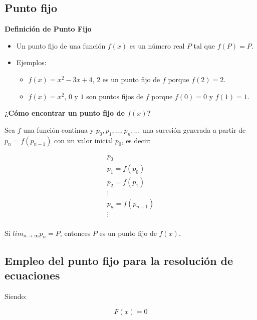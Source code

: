 \documentclass[openany]{book}
\providecommand{\tightlist}{%
  \setlength{\itemsep}{0pt}\setlength{\parskip}{0pt}}
\begin{document}
\hypertarget{punto-fijo}{%
\subsection{Punto fijo}\label{punto-fijo}}

\textbf{Definición de Punto Fijo}

\begin{itemize}
\item
  Un punto fijo de una función \(f(x)\) es un número real \(P\) tal que \(f(P)=P\).
\item
  Ejemplos:

  \begin{itemize}
  \tightlist
  \item
    \(f(x)=x^{2}-3x+4\), \(2\) es un punto fijo de \(f\) porque \(f(2) = 2\).
  \item
    \(f(x)=x^{2}\), \(0\) y \(1\) son puntos fijos de \(f\) porque \(f(0) = 0\) y \(f(1) = 1\).
  \end{itemize}
\end{itemize}

\textbf{¿Cómo encontrar un punto fijo de \(f(x)\)?}

Sea \(f\) una función continua y \(p_0, p_1, \dots, p_n, \dots\) una sucesión generada a partir de \(p_{n} = f(p_{n-1})\) con un valor inicial \(p_0\), es decir:

\begin{gather*}
p_0 \\
p_1 = f(p_0) \\
p_2 = f(p_1) \\
\vdots \\
p_n = f(p_{n-1}) \\
\vdots \\
\end{gather*}

Si \(lim_{n\to\infty} p_n = P\), entonces \(P\) es un punto fijo de \(f(x)\).

\hypertarget{empleo-del-punto-fijo-para-la-resoluciuxf3n-de-ecuaciones}{%
\subsection{Empleo del punto fijo para la resolución de ecuaciones}\label{empleo-del-punto-fijo-para-la-resoluciuxf3n-de-ecuaciones}}

Siendo:

\begin{equation}
F(x) = 0
\label{eq:a}
\end{equation}
\end{document}
